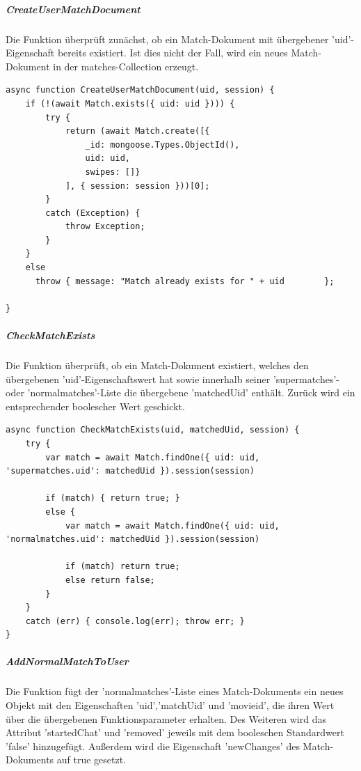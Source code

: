 \noindent
\subparagraph{CreateUserMatchDocument}
Die Funktion überprüft zunächst, ob ein Match-Dokument mit übergebener 'uid'-Eigenschaft bereits existiert. Ist dies nicht der Fall, wird ein neues Match-Dokument in der matches-Collection erzeugt.

\begin{lstlisting}[caption=Match Service - CreateUserMatchDocument, label=lst:matchserviceCreateUserMatchDocument]
async function CreateUserMatchDocument(uid, session) {
    if (!(await Match.exists({ uid: uid }))) {
        try {
            return (await Match.create([{
                _id: mongoose.Types.ObjectId(),
                uid: uid,
                swipes: []}
            ], { session: session }))[0];
        }
        catch (Exception) {
            throw Exception;
        }
    }
    else 
      throw { message: "Match already exists for " + uid 		};
    
}
\end{lstlisting}

\noindent
\subparagraph{CheckMatchExists}
Die Funktion überprüft, ob ein Match-Dokument existiert, welches den übergebenen 'uid'-Eigenschaftswert hat sowie innerhalb seiner 'supermatches'- oder 'normalmatches'-Liste die übergebene 'matchedUid' enthält. Zurück wird ein entsprechender boolescher Wert geschickt. 

\begin{lstlisting}[caption=Match Service - CreateUserMatchDocument, label=lst:matchserviceCreateUserMatchDocument]
async function CheckMatchExists(uid, matchedUid, session) {
    try {
        var match = await Match.findOne({ uid: uid, 'supermatches.uid': matchedUid }).session(session)

        if (match) { return true; }
        else {
            var match = await Match.findOne({ uid: uid, 'normalmatches.uid': matchedUid }).session(session)

            if (match) return true;
            else return false;
        }
    }
    catch (err) { console.log(err); throw err; }
}
\end{lstlisting}

\noindent
\subparagraph{AddNormalMatchToUser}
Die Funktion fügt der 'normalmatches'-Liste eines Match-Dokuments ein neues Objekt mit den Eigenschaften 'uid','matchUid' und 'movieid', die ihren Wert über die übergebenen Funktionsparameter erhalten. Des Weiteren wird das Attribut 'startedChat' und 'removed' jeweils mit dem booleschen Standardwert 'false' hinzugefügt. Außerdem wird die Eigenschaft 'newChanges' des Match-Dokuments auf true gesetzt.

